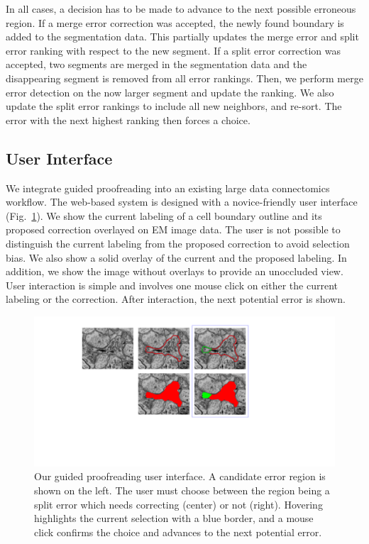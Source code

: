 \noindent \newline In all cases, a decision has to be made to advance to the next possible erroneous region. If a merge error correction was accepted, the newly found boundary is added to the segmentation data. This partially updates the merge error and split error ranking with respect to the new segment. If a split error correction was accepted, two segments are merged in the segmentation data and the disappearing segment is removed from all error rankings. Then, we perform merge error detection on the now larger segment and update the ranking. We also update the split error rankings to include all new neighbors, and re-sort. The error with the next highest ranking then forces a choice.

\subsection{User Interface}

We integrate guided proofreading into an existing large data connectomics workflow. The web-based system is designed with a novice-friendly user interface (Fig.~\ref{fig:ui}). We show the current labeling of a cell boundary outline and its proposed correction overlayed on EM image data. The user is not possible to distinguish the current labeling from the proposed correction to avoid selection bias. We also show a solid overlay of the current and the proposed labeling. In addition, we show the image without overlays to provide an unoccluded view. User interaction is simple and involves one mouse click on either the current labeling or the correction. After interaction, the next potential error is shown.

\begin{figure}[t]
\includegraphics[width=\linewidth]{gfx/user_interface_split.pdf}
\caption{Our guided proofreading user interface. A candidate error region is shown on the left. The user must choose between the region being a split error which needs correcting (center) or not (right). Hovering highlights the current selection with a blue border, and a mouse click confirms the choice and advances to the next potential error.}
\label{fig:ui}
\end{figure}

